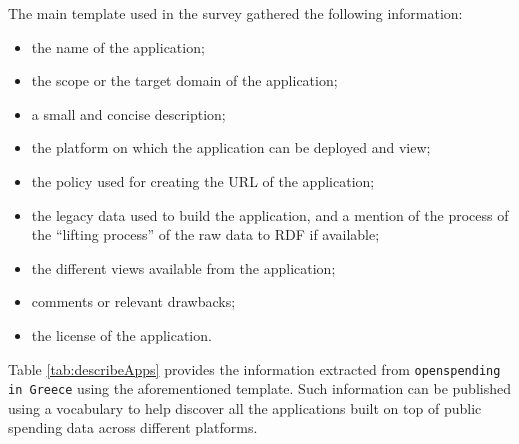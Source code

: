 The main template used in the survey gathered the following information:
\begin{itemize}
\item the name of the application;
\item the scope or the target domain of the application;
\item a small and concise description;
\item the platform on which the application can be deployed and view;
\item the policy used for creating the URL of the application;
\item the legacy data used to build the application, and a mention of the process of the ``lifting process'' of the raw data to RDF if available;
\item the different views available from the application;
\item comments or relevant drawbacks;
\item the license of the application.
\end{itemize}
Table \ref{tab:describeApps} provides the information extracted from \texttt{openspending in Greece} using the aforementioned template. Such information can be published using a vocabulary to help discover all the applications built on top of public spending data across different platforms.

